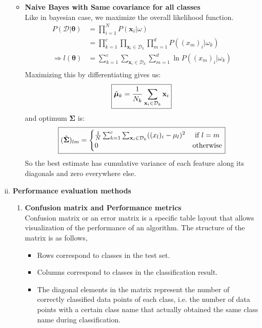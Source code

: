 \documentclass[11pt,paper=a4,answers]{exam}
\renewcommand{\vec}[1]{\mathbf{#1}}
\begin{document}
\begin{questions}
\begin{enumerate}[i.]
\begin{itemize}
                \item \textbf{Naive Bayes with Same covariance for all classes}\\
                Like in bayesian case, we maximize the overall likelihood function.\\
                \begin{align*}
                    P(\mathcal{D}| \bm{\theta}) &= \prod _{i=1}^N P(\vec{x}_i| \omega)\\
                    &= \prod _{k=1}^c \prod _{\vec{x}_i \in \mathcal{D}_k} \prod _{m=1}^d P((x_m)_i | \omega_k) \\ 
                    \Rightarrow l(\bm{\theta}) &= \sum_{k=1}^c \sum_{\vec{x}_i \in \mathcal{D}_k} \sum_{m=1}^d \ln P((x_m)_i | \omega_k) \\
                \end{align*}
                Maximizing this by differentiating gives us:
                $$\boxed{\hat{\bm{\mu}}_k = {1 \over N_k} \sum_{\vec{x}_i \in \mathcal{D}_k} \vec{x}_i }$$
                and optimum $\bm{\Sigma}$ is:
                $$\boxed{ (\hat{\bm{\Sigma}})_{lm} =
                \begin{cases}
                    {1 \over N}\sum_{k=1}^c\sum_{\vec{x}_i \in \mathcal{D}_k} ((x_l)_i - \mu_l)^2 &\text{ if } l = m\\
                    0 & \text{otherwise}
                \end{cases} }$$
                So the best estimate has cumulative variance of each feature along its diagonals and zero everywhere else.
            \end{itemize}
            \item \textbf{Performance evaluation methods}
            \begin{enumerate}
                \item \textbf{Confusion matrix and Performance metrics}\\
                    Confusion matrix or an error matrix is a specific table layout that allows visualization of the performance of an algorithm. The structure of the matrix is as follows, 
                    \begin{itemize}
                        \item Rows correspond to classes in the test set.
                        \item Columns correspond to classes in the classification result.
                        \item The diagonal elements in the matrix represent the number of correctly classified data points of each class, i.e. the number of data points with a certain class name that actually obtained the same class name during classification.

\end{itemize}
\end{enumerate}
\end{enumerate}
\end{questions}
\end{document}
